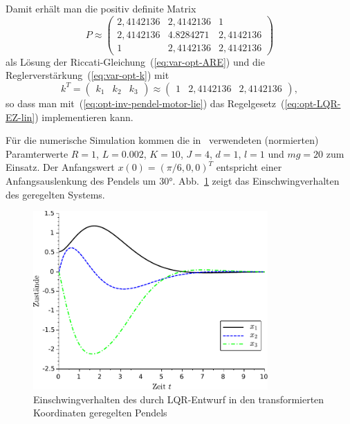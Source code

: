 \begin{example}
Damit erhält man die positiv definite Matrix
\begin{equation}
P\approx\left(\begin{array}{ccc}
2,4142136 & 2,4142136 & 1\\
2,4142136 & 4.8284271 & 2,4142136\\
1 & 2,4142136 & 2,4142136
\end{array}\right)\label{eq:opt-inv-pendel-motor-P}
\end{equation}
als Lösung der Riccati-Gleichung~(\ref{eq:var-opt-ARE}) und die
Reglerverstärkung~(\ref{eq:var-opt-k}) mit
\[
k^{T}=\left(\begin{array}{ccc}
k_{1} & k_{2} & k_{3}\end{array}\right)\approx\left(\begin{array}{ccc}
1 & 2,4142136 & 2,4142136\end{array}\right),
\]
so dass man mit~(\ref{eq:opt-inv-pendel-motor-lie}) das Regelgesetz~(\ref{eq:opt-LQR-EZ-lin})
implementieren kann. 

Für die numerische Simulation kommen die in~\cite{gomez1994} verwendeten
(normierten) Paramterwerte $R=1$, $L=0.002$, $K=10$, $J=4$, $d=1$,
$l=1$ und $mg=20$ zum Einsatz. Der Anfangswert $x(0)=(\pi/6,0,0)^{T}$
entspricht einer Anfangsauslenkung des Pendels um $30\text{°}$.
Abb.~\ref{fig:opt-inv-pendel-motor-lqr} zeigt das Einschwingverhalten
des geregelten Systems.
\begin{figure}
\begin{centering}
\includegraphics[width=0.8\textwidth]{Inv_Pendel_Motor_LQR}
\par\end{centering}
\caption{Einschwingverhalten des durch LQR-Entwurf in den transformierten Koordinaten
geregelten Pendels\label{fig:opt-inv-pendel-motor-lqr}}

\end{figure}
\end{example}

